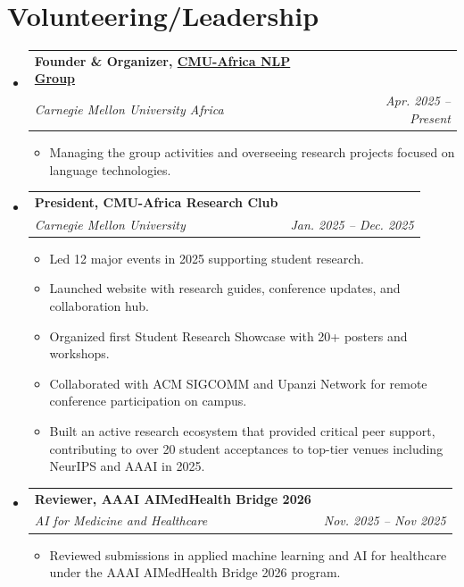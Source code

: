 \documentclass[letterpaper,10.99pt]{article}
\makeatletter
\newcommand{\resumeItem}[1]{
  \item\small{
    {#1 \vspace{-2pt}}
  }
}
\newcommand{\resumeSubheading}[4]{
  \vspace{0pt}\item
    \begin{tabular*}{0.97\textwidth}[t]{l@{\extracolsep{\fill}}r}
      \textbf{#1} & #2 \\
      \textit{\small#3} & \textit{\small #4} \\
    \end{tabular*}\vspace{-7pt}
}
\newcommand{\resumeSubHeadingListStart}{\begin{itemize}[leftmargin=0.15in, label={}]}
\newcommand{\resumeSubHeadingListEnd}{\end{itemize}}
\newcommand{\resumeItemListStart}{\begin{itemize}}
\newcommand{\resumeItemListEnd}{\end{itemize}\vspace{-5pt}}
\makeatother
\begin{document}


\section{Volunteering/Leadership}
  \resumeSubHeadingListStart

  \resumeSubheading
      {Founder \& Organizer, \href{https://cmuafrica-nlpgroup.pages.dev/}{CMU-Africa NLP Group}}{}
      {Carnegie Mellon University Africa}{Apr. 2025 -- Present}
      \resumeItemListStart
        \resumeItem{Managing the group activities and overseeing research projects focused on language technologies.}
      \resumeItemListEnd
      
    \resumeSubheading
      {President, CMU-Africa Research Club}{}
      {Carnegie Mellon University}{Jan. 2025 -- Dec. 2025}
      \resumeItemListStart
        \resumeItem{Led 12 major events in 2025 supporting student research.}
        \resumeItem{Launched website with research guides, conference updates, and collaboration hub.}
        \resumeItem{Organized first Student Research Showcase with 20+ posters and workshops.}
        \resumeItem{Collaborated with ACM SIGCOMM and Upanzi Network for remote conference participation on campus.}
        \resumeItem{Built an active research ecosystem that provided critical peer support, contributing to over 20 student acceptances to top-tier venues including NeurIPS and AAAI in 2025.}
      \resumeItemListEnd
    \resumeSubheading
  {Reviewer, AAAI AIMedHealth Bridge 2026}{}
  {AI for Medicine and Healthcare}{Nov. 2025 -- Nov 2025}
  \resumeItemListStart
    \resumeItem{Reviewed submissions in applied machine learning and AI for healthcare under the AAAI AIMedHealth Bridge 2026 program.}
  \resumeItemListEnd

  \resumeSubHeadingListEnd
\end{document}
